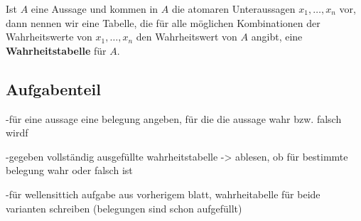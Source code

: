 \documentclass{uebungsblatt}
\begin{document}
\newpage


\begin{definition}
    Ist $A$ eine Aussage und kommen in $A$ die atomaren Unteraussagen $x_1,\dots,x_n$ vor, dann nennen wir eine Tabelle, die für alle möglichen Kombinationen der Wahrheitswerte von $x_1,\dots,x_n$ den Wahrheitswert von $A$ angibt, eine \textbf{Wahrheitstabelle} für $A$.
\end{definition}

\subsection*{Aufgabenteil}

-für eine aussage eine belegung angeben, für die die aussage wahr bzw. falsch wirdf

-gegeben vollständig ausgefüllte wahrheitstabelle -> ablesen, 
ob für bestimmte belegung wahr oder falsch ist

-für wellensittich aufgabe aus vorherigem blatt, 
wahrheitabelle für beide varianten schreiben (belegungen sind schon aufgefüllt)

\end{document}

